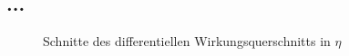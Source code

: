 \subsection{...}
\begin{figure}[tbp]
	\centering
	\caption{Schnitte des differentiellen Wirkungsquerschnitts in $\eta$}
	\label{5,8}
\end{figure}

